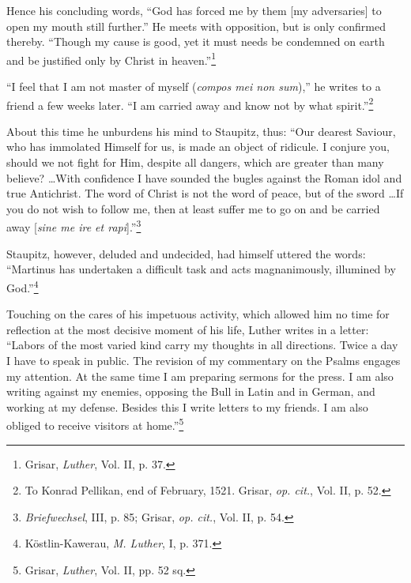 Hence his concluding words, “God has forced me by them [my adversaries]
to open my mouth still further.” He meets with opposition, but is
only confirmed thereby. “Though my cause is good, yet it must needs be
condemned on earth and be justified only by Christ in heaven.”\footnote
{Grisar, \textit{Luther}, Vol. II, p. 37.}

“I feel that I am not master of myself (\textit{compos mei non sum}),” he
writes to a friend a few weeks later. “I am carried away and know not by
what spirit.”\footnote
{To Konrad Pellikan, end of February, 1521. Grisar, \textit{op. cit.}, Vol. II, p. 52.}

About this time he unburdens his mind to Staupitz, thus: “Our dearest
Saviour, who has immolated Himself for us, is made an object of ridicule.
I conjure you, should we not fight for Him, despite all dangers, which are
greater than many believe? \dots With confidence I have sounded the bugles
against the Roman idol and true Antichrist. The word of Christ is not the
word of peace, but of the sword \dots If you do not wish to follow me, then
at least suffer me to go on and be carried away [\textit{sine me ire et rapi}].”\footnote
{\textit{Briefwechsel}, III, p. 85; Grisar, \textit{op. cit.}, Vol. II, p. 54.}

Staupitz, however, deluded and undecided, had himself uttered the words:
“Martinus has undertaken a difficult task and acts magnanimously, illumined
by God.”\footnote{Köstlin-Kawerau, \textit{M. Luther}, I, p. 371.}

Touching on the cares of his impetuous activity, which allowed him no
time for reflection at the most decisive moment of his life, Luther writes
in a letter: “Labors of the most varied kind carry my thoughts in all directions.
Twice a day I have to speak in public. The revision of my commentary
on the Psalms engages my attention. At the same time I am preparing sermons
for the press. I am also writing against my enemies, opposing the Bull
in Latin and in German, and working at my defense. Besides this I write
letters to my friends. I am also obliged to receive visitors at home.”\footnote
{Grisar, \textit{Luther}, Vol. II, pp. 52 sq.}

